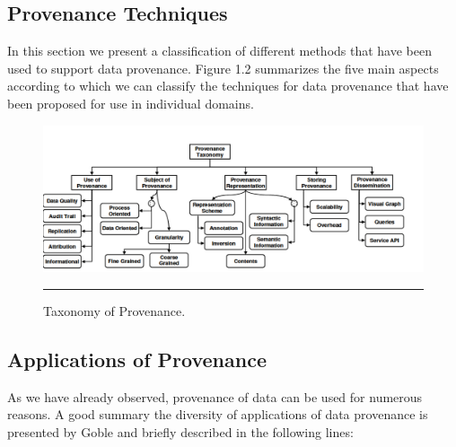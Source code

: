 \subsection{Provenance Techniques}

In this section we present a classification of different methods that have been used to support data provenance. Figure 1.2 summarizes the five main aspects according to which we can classify the techniques for data provenance that have been proposed for use in individual domains\cite{reference4}.

\begin{figure}[htbp]
	\centering
		\includegraphics[scale=0.35]{./Figures/chapter2/figure2.pdf}
		\rule{35em}{0.5pt}
	\caption[Taxonomy of Provenance]{Taxonomy of Provenance\cite{reference4}.}
	\label{fig:provTaxonomy}
\end{figure}


\subsection{Applications of Provenance}

As we have already observed, provenance of data can be used for numerous reasons. A good summary the diversity of applications of data provenance is presented by Goble\cite{reference4:14} and briefly described in the following lines:


